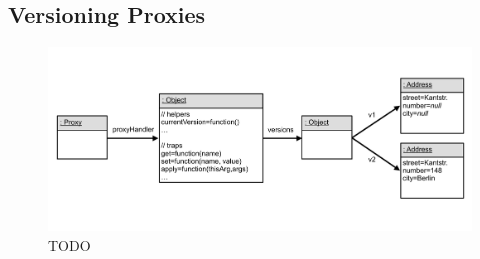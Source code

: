 \subsection{Versioning Proxies}


\begin{figure}[h]
    \centering
    \includegraphics[width=\textwidth]{figures/5_implementation/2_versioningProxy.pdf}
    \caption{TODO}
    \label{fig:LoggingProxy}
\end{figure}



    
    
    





